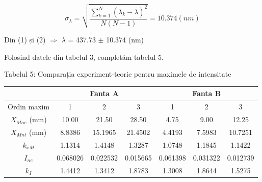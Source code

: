 \documentclass{article}
\begin{document}
\begin{equation}
    {\sigma}{_{\lambda}} = \sqrt{\frac{\sum_{k=1}^{N}({\lambda}{_k} - \overline{\lambda})^2}{N(N-1)}} = 10.374 (nm)
\end{equation} \newline

Din (1) și (2) $\Rightarrow$ $\lambda$ = 437.73 $\pm$ 10.374 (nm) \newline

Folosind datele din tabelul 3, completăm tabelul 5. \newline

\makebox[-1cm]{} Tabelul 5: Comparația experiment-teorie pentru maximele de intensitate

\begin{table}[H]
    \begin{tabular}{|c|ccc|ccc|}
    \hline
                        & \multicolumn{3}{c|}{Fanta A}                                             & \multicolumn{3}{c|}{Fanta B}                                             \\ \hline
    Ordin maxim         & \multicolumn{1}{c|}{1}        & \multicolumn{1}{c|}{2}        & 3        & \multicolumn{1}{c|}{1}        & \multicolumn{1}{c|}{2}        & 3        \\ \hline
    ${X}{_{Mn e}}$ (mm) & \multicolumn{1}{c|}{10.00}    & \multicolumn{1}{c|}{21.50}    & 28.50    & \multicolumn{1}{c|}{4.75}     & \multicolumn{1}{c|}{9.00}     & 12.25    \\ \hline
    ${X}{_{Mn t}}$ (mm) & \multicolumn{1}{c|}{8.8386}   & \multicolumn{1}{c|}{15.1965}  & 21.4502  & \multicolumn{1}{c|}{4.4193}   & \multicolumn{1}{c|}{7.5983}   & 10.7251  \\ \hline
    ${k}{_{xM}}$        & \multicolumn{1}{c|}{1.1314}   & \multicolumn{1}{c|}{1.4148}   & 1.3287   & \multicolumn{1}{c|}{1.0748}   & \multicolumn{1}{c|}{1.1845}   & 1.1422   \\ \hline
    ${I}{_{ne}}$        & \multicolumn{1}{c|}{0.068026} & \multicolumn{1}{c|}{0.022532} & 0.015665 & \multicolumn{1}{c|}{0.061398} & \multicolumn{1}{c|}{0.031322} & 0.012739 \\ \hline
    ${k}{_I}$           & \multicolumn{1}{c|}{1.4412}   & \multicolumn{1}{c|}{1.3412}   & 1.8783   & \multicolumn{1}{c|}{1.3008}   & \multicolumn{1}{c|}{1.8644}   & 1.5275   \\ \hline
    \end{tabular}
    \end{table}
\end{document}
